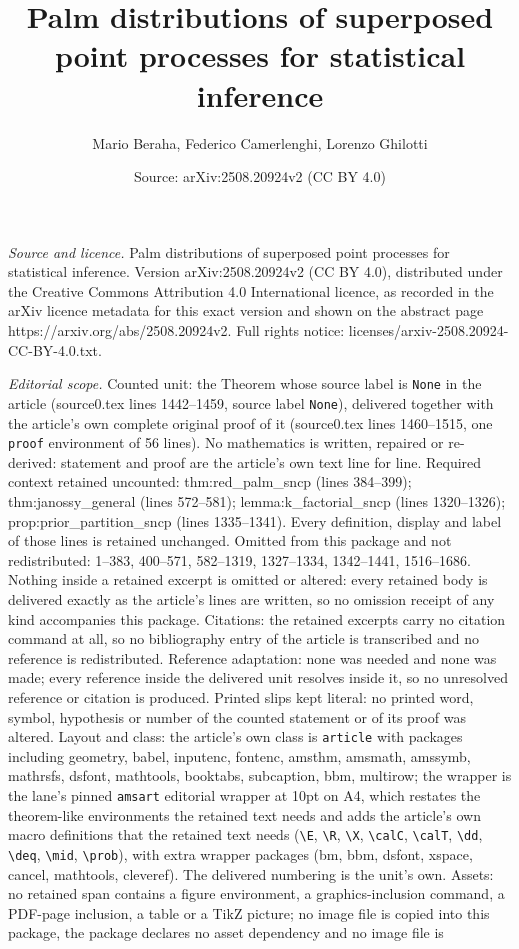 \documentclass[10pt,a4paper]{amsart}
\title[Palm distributions of superposed point processes for statist]{Palm distributions of superposed point processes for statistical inference}
\author{Mario Beraha, Federico Camerlenghi, Lorenzo Ghilotti}
\date{Source: arXiv:2508.20924v2 (CC BY 4.0)}
\begin{document}
\maketitle

\noindent\emph{Source and licence.} Palm distributions of superposed point processes for statistical inference. Version arXiv:2508.20924v2 (CC BY 4.0), distributed under the Creative Commons Attribution 4.0 International licence, as recorded in the arXiv licence metadata for this exact version and shown on the abstract page https://arxiv.org/abs/2508.20924v2. Full rights notice: licenses/arxiv-2508.20924-CC-BY-4.0.txt.\par\smallskip

\noindent\textit{Editorial scope.} Counted unit: the Theorem whose source label is \texttt{None} in the article (source0.tex lines 1442--1459, source label \texttt{None}), delivered together with the article's own complete original proof of it (source0.tex lines 1460--1515, one \texttt{proof} environment of 56 lines). No mathematics is written, repaired or re-derived: statement and proof are the article's own text line for line. Required context retained uncounted: thm:red\_palm\_sncp (lines 384--399); thm:janossy\_general (lines 572--581); lemma:k\_factorial\_sncp (lines 1320--1326); prop:prior\_partition\_sncp (lines 1335--1341). Every definition, display and label of those lines is retained unchanged. Omitted from this package and not redistributed: 1--383, 400--571, 582--1319, 1327--1334, 1342--1441, 1516--1686. Nothing inside a retained excerpt is omitted or altered: every retained body is delivered exactly as the article's lines are written, so no omission receipt of any kind accompanies this package. Citations: the retained excerpts carry no citation command at all, so no bibliography entry of the article is transcribed and no reference is redistributed. Reference adaptation: none was needed and none was made; every reference inside the delivered unit resolves inside it, so no unresolved reference or citation is produced. Printed slips kept literal: no printed word, symbol, hypothesis or number of the counted statement or of its proof was altered. Layout and class: the article's own class is \texttt{article} with packages including geometry, babel, inputenc, fontenc, amsthm, amsmath, amssymb, mathrsfs, dsfont, mathtools, booktabs, subcaption, bbm, multirow; the wrapper is the lane's pinned \texttt{amsart} editorial wrapper at 10pt on A4, which restates the theorem-like environments the retained text needs and adds the article's own macro definitions that the retained text needs (\texttt{\textbackslash E}, \texttt{\textbackslash R}, \texttt{\textbackslash X}, \texttt{\textbackslash calC}, \texttt{\textbackslash calT}, \texttt{\textbackslash dd}, \texttt{\textbackslash deq}, \texttt{\textbackslash mid}, \texttt{\textbackslash prob}), with extra wrapper packages (bm, bbm, dsfont, xspace, cancel, mathtools, cleveref). The delivered numbering is the unit's own. Assets: no retained span contains a figure environment, a graphics-inclusion command, a PDF-page inclusion, a table or a TikZ picture; no image file is copied into this package, the package declares no asset dependency and no image file is 
\end{document}

